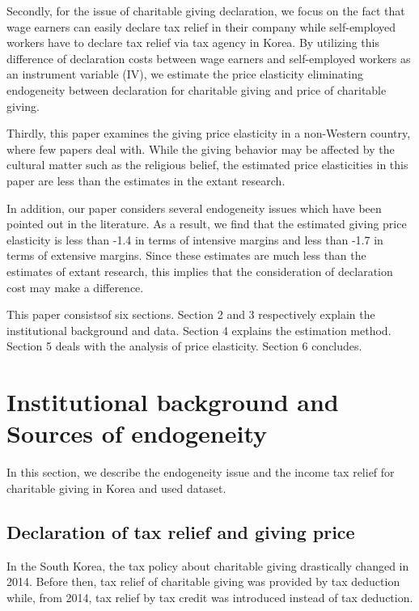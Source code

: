 \documentclass[
  11pt,
  a4paper,
]{article}
\begin{document}
Secondly, for the issue of charitable giving declaration, we focus on the fact that wage earners can easily declare tax relief in their company while self-employed workers have to declare tax relief via tax agency in Korea. By utilizing this difference of declaration costs between wage earners and self-employed workers as an instrument variable (IV), we estimate the price elasticity eliminating endogeneity between declaration for charitable giving and price of charitable giving.

Thirdly, this paper examines the giving price elasticity in a non-Western country, where few papers deal with. While the giving behavior may be affected by the cultural matter such as the religious belief, the estimated price elasticities in this paper are less than the estimates in the extant research.

In addition, our paper considers several endogeneity issues which have been pointed out in the literature. As a result, we find that the estimated giving price elasticity is less than -1.4 in terms of intensive margins and less than -1.7 in terms of extensive margins. Since these estimates are much less than the estimates of extant research, this implies that the consideration of declaration cost may make a difference.

This paper consistsof six sections. Section 2 and 3 respectively explain the institutional background and data. Section 4 explains the estimation method. Section 5 deals with the analysis of price elasticity. Section 6 concludes.

\hypertarget{institutional-background-and-sources-of-endogeneity}{%
\section{Institutional background and Sources of endogeneity}\label{institutional-background-and-sources-of-endogeneity}}

In this section, we describe the endogeneity issue and the income tax relief for charitable giving in Korea and used dataset.

\hypertarget{declaration-of-tax-relief-and-giving-price}{%
\subsection{Declaration of tax relief and giving price}\label{declaration-of-tax-relief-and-giving-price}}

In the South Korea, the tax policy about charitable giving drastically changed in 2014. Before then, tax relief of charitable giving was provided by tax deduction while, from 2014, tax relief by tax credit was introduced instead of tax deduction.
\end{document}
